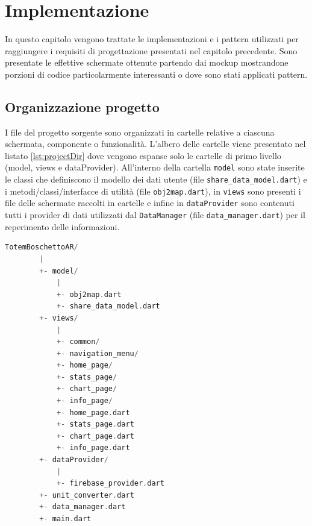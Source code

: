 \chapter{Implementazione}
In questo capitolo vengono trattate le implementazioni e i pattern utilizzati per raggiungere i requisiti di progettazione presentati nel capitolo precedente. Sono presentate le effettive schermate ottenute partendo dai mockup mostrandone porzioni di codice particolarmente interessanti o dove sono stati applicati pattern.

\section{Organizzazione progetto}
I file del progetto sorgente sono organizzati in cartelle relative a ciascuna schermata, componente o funzionalità. L'albero delle cartelle viene presentato nel listato \ref{lst:projectDir} dove vengono espanse solo le cartelle di primo livello (model, views e dataProvider). All'interno della cartella \texttt{model} sono state inserite le classi che definiscono il modello dei dati utente (file \texttt{share\_data\_model.dart}) e i metodi/classi/interfacce di utilità (file \texttt{obj2map.dart}), in \texttt{views} sono presenti i file delle schermate raccolti in cartelle e infine in \texttt{dataProvider} sono contenuti tutti i provider di dati utilizzati dal \texttt{DataManager} (file \texttt{data\_manager.dart}) per il reperimento delle informazioni.

\begin{lstlisting}[language=C, caption={Albero della directory del progetto TotemBoschettoAR}, label={lst:projectDir}]
    TotemBoschettoAR/
        |
        +- model/
            |
            +- obj2map.dart
            +- share_data_model.dart
        +- views/
            |
            +- common/
            +- navigation_menu/
            +- home_page/
            +- stats_page/
            +- chart_page/
            +- info_page/
            +- home_page.dart
            +- stats_page.dart
            +- chart_page.dart
            +- info_page.dart
        +- dataProvider/
            |
            +- firebase_provider.dart
        +- unit_converter.dart
        +- data_manager.dart
        +- main.dart
\end{lstlisting}

